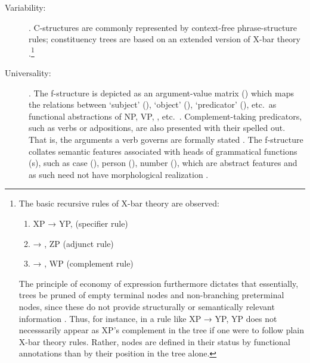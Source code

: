 \begin{description}
\item[Variability:] . 
C-structures are commonly represented by context-free phrase-structure rules;
constituency trees are based on an extended version of X-bar theory \citep[42]{bresnan2016}.\footnote{The basic recursive rules of X-bar
theory are observed:
\begin{enumerate}[nosep, leftmargin={2\footnotemargin}]
\item XP → YP,  (specifier rule)
\item {} → , ZP (adjunct rule)
\item {} → , WP (complement rule)
\end{enumerate}

The principle of economy of expression furthermore dictates that essentially,
trees be pruned of empty terminal nodes and non-branching preterminal nodes,
since these do not provide structurally or semantically relevant information
\citep[119--128]{bresnan2016}. Thus, for instance, in a rule like XP →
 YP, YP does not necesssarily appear as XP's complement in the tree if
one were to follow plain X-bar theory rules. Rather, nodes
are defined in their status by functional annotations than by their position in
the tree alone.}

\item[Universality:] . The f-structure is depicted
as an argument-value matrix (\Avm{}) which maps the relations between `subject'
(\Subj{}), `object' (\Obj{}), `predicator' (\Pred{}), etc.\ as functional
abstractions of NP, VP, , etc.\ \citep[42]{bresnan2016}.
Complement-taking predicators, such as verbs or adpositions, are also presented
with their  spelled out. That is, the arguments a verb governs
are formally stated \citep[15]{bresnan2016}. The f-structure collates semantic
features associated with heads of grammatical functions (\GF{}s), such as case
(\Case{}), person (\Pers{}), number (\Num{}), which are abstract features and
as such need not have morphological realization \citep[43]{bresnan2016}.


\end{description}
